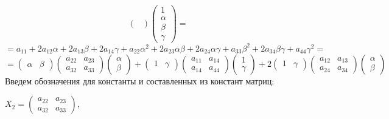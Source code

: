 \documentclass[pdftex,ptm,12pt,a4paper]{report}
\begin{document}
\begin{enumerate}
\[\begin{pmatrix}
        \end{pmatrix}
        \begin{pmatrix} 1 \\ \alpha \\ \beta \\ \gamma \end{pmatrix}  = 
    \]\[
        = a_{11} + 2a_{12}\alpha + 2a_{13}\beta + 2a_{14}\gamma + 
                 a_{22}\alpha^2 + 2a_{23}\alpha\beta + 2a_{24}\alpha\gamma + 
                                  a_{33}\beta^2 + 2a_{34}\beta\gamma + 
                                                  a_{44}\gamma^2  = 
    \]\[
        = \begin{pmatrix} \alpha & \beta \end{pmatrix} 
          \begin{pmatrix} 
              a_{22} & a_{23} \\ 
              a_{32} & a_{33} 
        \end{pmatrix}
        \begin{pmatrix} \alpha \\ \beta \end{pmatrix} 
      + \begin{pmatrix} 1 & \gamma \end{pmatrix} 
          \begin{pmatrix} 
              a_{11} & a_{14} \\ 
              a_{14} & a_{44} 
        \end{pmatrix}
        \begin{pmatrix} 1 \\ \gamma \end{pmatrix}         
      + 2\begin{pmatrix} 1 & \gamma \end{pmatrix} 
          \begin{pmatrix} 
              a_{12} & a_{13} \\ 
              a_{24} & a_{34} 
        \end{pmatrix}
        \begin{pmatrix} \alpha \\ \beta \end{pmatrix} 
    \] 
    Введем обозначения для константы и составленных из констант матриц: 

        $X_2 = \begin{pmatrix} 
              a_{22} & a_{23} \\ 
              a_{32} & a_{33} 
        \end{pmatrix}$, 


\end{enumerate}
\end{document}
